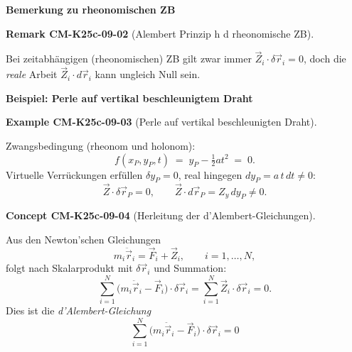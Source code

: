 \documentclass[10pt, letterpaper]{article}
\newcommand{\CustomHeading}[3]{%
  \par\medskip\noindent%
  \textbf{#1 #2} \textnormal{(#3)}.\enskip%
}
\newenvironment{REM}[2]{\begin{unitbox}\CustomHeading{Remark}{#1}{#2}}{\end{unitbox}}
\newenvironment{EXA}[2]{\begin{unitbox}\CustomHeading{Example}{#1}{#2}}{\end{unitbox}}
\newenvironment{CONC}[2]{\begin{unitbox}\CustomHeading{Concept}{#1}{#2}}{\end{unitbox}}
\begin{document}
\textbf{Bemerkung zu rheonomischen ZB}\\

\begin{REM}{CM-K25c-09-02}{Alembert Prinzip h d rheonomische ZB}
Bei zeitabhängigen (rheonomischen) ZB gilt zwar immer 
$\vec Z_i\!\cdot\!\delta\vec r_i=0$,  
doch die \emph{reale} Arbeit $\vec Z_i\!\cdot\!d\vec r_i$ kann ungleich 
Null sein.
\end{REM}

\textbf{Beispiel: Perle auf vertikal beschleunigtem Draht}

\begin{EXA}{CM-K25c-09-03}{Perle auf vertikal beschleunigten Draht}
\begin{center}
\end{center}

Zwangsbedingung (rheonom und holonom):
\[
  f(x_P,y_P,t) \;=\; y_P - \tfrac12 a t^{2} \;=\; 0 .
\]
Virtuelle Verrückungen erfüllen $\delta y_P = 0$, real hingegen 
$dy_P = a\,t\,dt \neq 0$:
\[
  \vec Z\!\cdot\!\delta\vec r_P = 0,
  \qquad
  \vec Z\!\cdot\!d\vec r_P = Z_y\,dy_P \neq 0.
\]
\end{EXA}


\begin{CONC}{CM-K25c-09-04}{Herleitung der d’Alembert-Gleichungen}
Aus den Newton’schen Gleichungen
\[
  m_i\ddot{\vec r}_i = \vec F_i + \vec Z_i,
  \qquad i=1,\dots,N,
\]
folgt nach Skalar­produkt mit $\delta\vec r_i$ und Summation:
\[
  \sum_{i=1}^{N}\bigl(m_i\ddot{\vec r}_i - \vec F_i\bigr)\!\cdot\!\delta\vec r_i
  = \sum_{i=1}^{N}\vec Z_i\!\cdot\!\delta\vec r_i = 0.
\]
Dies ist die \emph{d’Alembert-Gleichung}
\[
  \boxed{\;
    \sum_{i=1}^{N}\bigl(m_i\ddot{\vec r}_i - \vec F_i\bigr)
    \!\cdot\!\delta\vec r_i = 0
  \;}
\]
\end{CONC}
\end{document}
